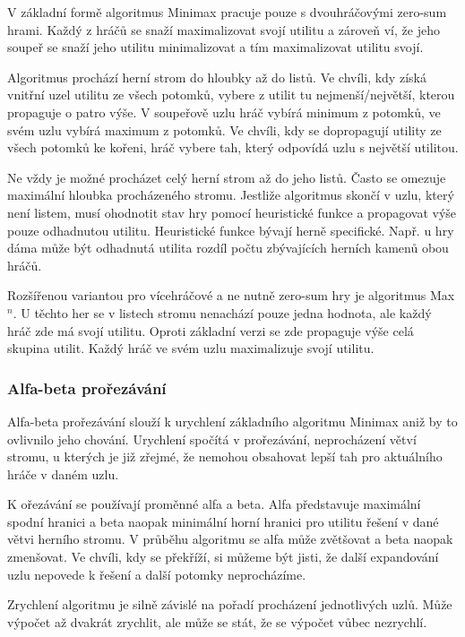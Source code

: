 V základní formě algoritmus Minimax\cite{minimax} pracuje pouze s dvouhráčovými zero-sum hrami. Každý z hráčů se snaží maximalizovat svojí utilitu a zároveň ví, že jeho soupeř se snaží jeho utilitu minimalizovat a tím maximalizovat utilitu svojí. 

Algoritmus prochází herní strom do hloubky až do listů. Ve chvíli, kdy získá vnitřní uzel utilitu ze všech potomků, vybere z utilit tu nejmenší/největší, kterou propaguje o patro výše. V soupeřově uzlu hráč vybírá minimum z potomků, ve svém uzlu vybírá maximum z potomků. Ve chvíli, kdy se dopropagují utility ze všech potomků ke kořeni, hráč vybere tah, který odpovídá uzlu s největší utilitou.

Ne vždy je možné procházet celý herní strom až do jeho listů. Často se omezuje maximální hloubka procházeného stromu. Jestliže algoritmus skončí v uzlu, který není listem, musí ohodnotit stav hry pomocí heuristické funkce a propagovat výše pouze odhadnutou utilitu. Heuristické funkce bývají herně specifické. Např. u hry dáma může být odhadnutá utilita rozdíl počtu zbývajících herních kamenů obou hráčů.

Rozšířenou variantou pro vícehráčové a ne nutně zero-sum hry je algoritmus Max$^n$\cite{maxn}. U těchto her se v listech stromu nenachází pouze jedna hodnota, ale každý hráč zde má svojí utilitu. Oproti základní verzi se zde propaguje výše celá skupina utilit. Každý hráč ve svém uzlu maximalizuje svojí utilitu.

\subsubsection{Alfa-beta prořezávání}

Alfa-beta prořezávání slouží k urychlení základního algoritmu Minimax aniž by to ovlivnilo jeho chování. Urychlení spočítá v prořezávání, neprocházení větví stromu, u kterých je již zřejmé, že nemohou obsahovat lepší tah pro aktuálního hráče v daném uzlu.

K ořezávání se používají proměnné alfa a beta. Alfa představuje maximální spodní hranici a beta naopak minimální horní hranici pro utilitu řešení v dané větvi herního stromu. V průběhu algoritmu se alfa může zvětšovat a beta naopak zmenšovat. Ve chvíli, kdy se překříží, si můžeme být jisti, že další expandování uzlu nepovede k řešení a další potomky neprocházíme.

Zrychlení algoritmu je silně závislé na pořadí procházení jednotlivých uzlů. Může výpočet až dvakrát zrychlit, ale může se stát, že se výpočet vůbec nezrychlí.

